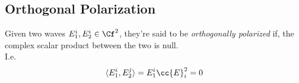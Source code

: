 \documentclass[../electromagnetism.tex]{subfiles}
\begin{document}
\subsection{Orthogonal Polarization}
Given two waves $E_1^i,E_2^i\in\Cf^2$, they're said to be \textit{orthogonally polarized} if, the complex scalar product between the two is null.\\
I.e.
\begin{equation}
	\langle E_1^i, E_2^j \rangle = E_1^i\cc{E}^2_i=0
	\label{eq:orthpol}
\end{equation}
\end{document}
